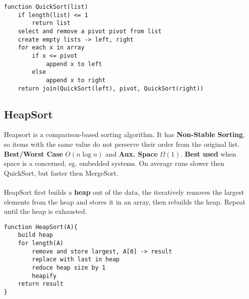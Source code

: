 \documentclass{article}
\begin{document}
\begin{lstlisting}[style=pseudo]
function QuickSort(list)
	if length(list) <= 1
		return list
	select and remove a pivot pivot from list
	create empty lists -> left, right
	for each x in array
		if x <= pivot
			append x to left
		else
			append x to right
	return join(QuickSort(left), pivot, QuickSort(right))
\end{lstlisting}



\subsection{HeapSort}

Heapsort is a comparison-based sorting algorithm. It has {\bf Non-Stable Sorting}, so items with the same value do not perserve their order from the original list. {\bf Best/Worst Case} $O(n \log n)$ and {\bf Aux. Space} $\Omega(1)$. {\bf Best used} when space is a concerned, eg. embedded systems. On average runs slower then QuickSort, but faster then MergeSort.
\\ \\
HeapSort first builds a {\bf heap} out of the data, the iteratively removes the largest elements from the heap and stores it in an array, then rebuilds the heap. Repeat until the heap is exhausted.
\begin{lstlisting}[style=pseudo]
function HeapSort(A){
	build heap
	for length(A)
		remove and store largest, A[0] -> result
		replace with last in heap
		reduce heap size by 1
		heapify
	return result
}
\end{lstlisting}
\end{document}
